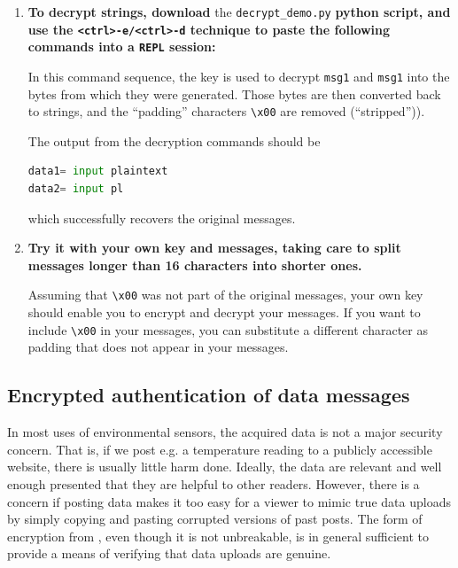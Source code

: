 \begin{enumerate}
	\item \textbf{To decrypt strings, download} the \lstinline{decrypt_demo.py} \textbf{python script, and use the \lstinline{<ctrl>-e/<ctrl>-d} technique to paste the following commands into a \texttt{REPL} session:}


	In this command sequence, the key is used to decrypt \lstinline{msg1} and  \lstinline{msg1} into the bytes from which they were generated.
	Those bytes are then converted back to strings, and the ``padding'' characters \lstinline{\x00} are removed (``stripped'')).

	The output from the decryption commands should be
\begin{lstlisting}[language=Python]
data1= input plaintext
data2= input pl
\end{lstlisting}
	which successfully recovers the original messages.
	
	\item \textbf{Try it with your own key and messages, taking care to split messages longer than 16 characters into shorter ones.}
	
	Assuming that \lstinline{\x00} was not part of the original messages, your own key should enable you to encrypt and decrypt your messages.
	If you want to include \lstinline{\x00} in your messages, you can substitute a different character as padding that does not appear in your messages. 
\end{enumerate}


\subsection{Encrypted authentication of data messages}
In most uses of environmental sensors, the acquired data is not a major security concern.  
That is, if we post e.g. a temperature reading to a publicly accessible website, there is usually little harm done.
Ideally, the data are relevant and well enough presented that they are helpful to other readers.
However, there is a concern if posting data makes it too easy for a viewer to mimic true data uploads by simply copying and pasting corrupted versions of past posts.
The form of encryption from , even though it is not unbreakable, is in general sufficient to provide a means of verifying that data uploads are genuine.

